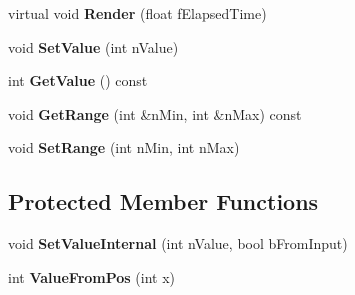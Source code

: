 \begin{DoxyCompactItemize}
\item 
\hypertarget{class_c_d_x_u_t_slider_adf437bac149457d400ecde129a0d8b1b}{virtual void {\bfseries Render} (float f\+Elapsed\+Time)}\label{class_c_d_x_u_t_slider_adf437bac149457d400ecde129a0d8b1b}

\item 
\hypertarget{class_c_d_x_u_t_slider_a0f3442fdf18473cd6c7dd6f8d065ee9e}{void {\bfseries Set\+Value} (int n\+Value)}\label{class_c_d_x_u_t_slider_a0f3442fdf18473cd6c7dd6f8d065ee9e}

\item 
\hypertarget{class_c_d_x_u_t_slider_a74bf427b42c992666beddd456fe812e6}{int {\bfseries Get\+Value} () const }\label{class_c_d_x_u_t_slider_a74bf427b42c992666beddd456fe812e6}

\item 
\hypertarget{class_c_d_x_u_t_slider_a84b28fcfeb72033f7ad4df3b505e62e5}{void {\bfseries Get\+Range} (int \&n\+Min, int \&n\+Max) const }\label{class_c_d_x_u_t_slider_a84b28fcfeb72033f7ad4df3b505e62e5}

\item 
\hypertarget{class_c_d_x_u_t_slider_a9401e45afcdd5c8f74e6120402ec068d}{void {\bfseries Set\+Range} (int n\+Min, int n\+Max)}\label{class_c_d_x_u_t_slider_a9401e45afcdd5c8f74e6120402ec068d}

\end{DoxyCompactItemize}
\subsection*{Protected Member Functions}
\begin{DoxyCompactItemize}
\item 
\hypertarget{class_c_d_x_u_t_slider_ab345296137df0bba5b421c5f0e58ca8e}{void {\bfseries Set\+Value\+Internal} (int n\+Value, bool b\+From\+Input)}\label{class_c_d_x_u_t_slider_ab345296137df0bba5b421c5f0e58ca8e}

\item 
\hypertarget{class_c_d_x_u_t_slider_a9f7de7328ec31bd8a34bc1873f5acdb3}{int {\bfseries Value\+From\+Pos} (int x)}\label{class_c_d_x_u_t_slider_a9f7de7328ec31bd8a34bc1873f5acdb3}

\end{DoxyCompactItemize}
